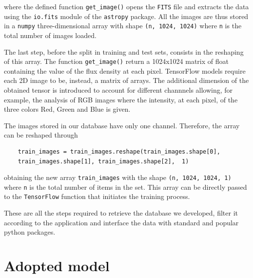 \documentclass[a4paper,10pt]{report}
\begin{document}
where the defined function \lstinline{get_image()} opens the \lstinline{FITS} file 
and extracts
the data using the \lstinline{io.fits} module of 
the \lstinline{astropy} package. All the images are thus
stored in a \lstinline{numpy} three-dimensional array 
with shape \lstinline{(n, 1024, 1024)} where \lstinline{n} is the total number of images loaded.

The last step, before the split in training and test sets, consists 
in the reshaping of this array. The  
function \lstinline{get_image()} return a 1024x1024 matrix of float containing
the value of the flux density at each pixel. 
TensorFlow models require each 2D image to be, instead, a matrix of arrays.
The additional dimension of the obtained tensor is introduced to account for 
different channnels allowing, for example, the analysis of RGB images where 
the intensity, at each pixel, of the three colors Red, Green and Blue is given.

The images stored in our database have only one channel. Therefore,
the array can be reshaped through

\begin{lstlisting}
    train_images = train_images.reshape(train_images.shape[0], 
    train_images.shape[1], train_images.shape[2],  1)
\end{lstlisting}

obtaining the new array \lstinline{train_images} with the shape \lstinline{(n, 1024, 1024, 1)}
where \lstinline{n} is the total number of items in the set.
This array can be directly passed to the \lstinline{TensorFlow} function that initiates
the training process.

These are all the steps required to retrieve the database we developed, filter it according to the application
and interface the data with standard and popular python packages.

\section{Adopted model}

\end{document}
